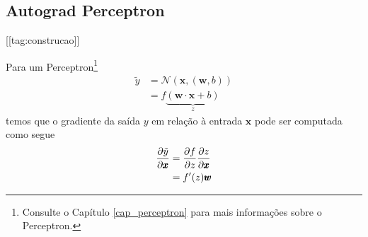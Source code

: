 \subsection{Autograd Perceptron}

[[tag:construcao]]

Para um Perceptron\footnote{Consulte o Capítulo \ref{cap_perceptron} para mais informações sobre o Perceptron.}
\begin{subequations}
  \begin{align}
    \tilde{y} &= \mathcal{N}\left(\pmb{x}, (\pmb{w}, b)\right)\\
              &= f\underbrace{(\pmb{w}\cdot\pmb{x} + b)}_{z}
  \end{align}
\end{subequations}
temos que o gradiente da saída $y$ em relação à entrada $\pmb{x}$ pode ser computada como segue
\begin{subequations}
  \begin{align}
    \frac{\partial \tilde{y}}{\partial\pmb{x}} &= \frac{\partial f}{\partial z}\frac{\partial z}{\partial\pmb{x}}\\
                                   &= f'(z)\pmb{w}
  \end{align}
\end{subequations}


